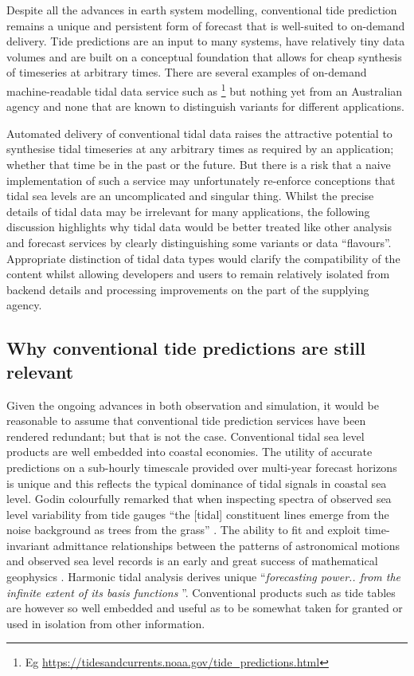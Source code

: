 Despite all the advances in earth system modelling, conventional tide prediction remains a unique and persistent form of forecast that is well-suited to on-demand delivery.  Tide predictions are an input to many systems, have relatively tiny data volumes and are built on a conceptual foundation that allows for cheap synthesis of timeseries at arbitrary times.    There are several examples of on-demand machine-readable tidal data service such as  \footnote{Eg \url{https://tidesandcurrents.noaa.gov/tide_predictions.html}} but nothing yet from an Australian agency and none that are known to distinguish variants for different applications.


Automated delivery of conventional tidal data raises the attractive potential to synthesise tidal timeseries at any arbitrary times as required by an application; whether that time be in the past or the future.   But there is a risk that a naive implementation of such a service may unfortunately re-enforce conceptions that tidal sea levels are an uncomplicated and singular thing.    
Whilst the precise details of tidal data may be irrelevant for many applications, the following discussion highlights why tidal data would be better treated like other analysis and forecast services by clearly distinguishing some variants or data ``flavours''. 
Appropriate distinction of tidal data types would clarify the compatibility of the content whilst allowing developers and users to remain relatively isolated from backend details and processing improvements on the part of the supplying agency.

\subsection{Why conventional tide predictions are still relevant}
Given the ongoing advances in both observation and simulation, it would be reasonable to assume that conventional tide prediction services have been rendered redundant; but that is not the case. 
Conventional tidal sea level products are well embedded into coastal economies.   The utility of accurate predictions on a sub-hourly timescale provided over multi-year forecast horizons is unique and this reflects the typical dominance of tidal signals in coastal sea level.
Godin colourfully remarked that when inspecting spectra of observed sea level variability from tide gauges ``the [tidal] constituent lines emerge from the noise background as trees from the grass'' \citep{godin:1972}.
The ability to fit and exploit time-invariant admittance relationships between the patterns of astronomical motions and observed sea level records is an early and great success of mathematical geophysics \citep{Cartwright:2000tt}.  Harmonic tidal analysis derives unique ``\textit{forecasting power.. from the infinite extent of its basis functions} ''\citep{Flinchem:2000kp}.
Conventional products such as tide tables are however so well embedded and useful as to be somewhat taken for granted or used in isolation from other information. 


